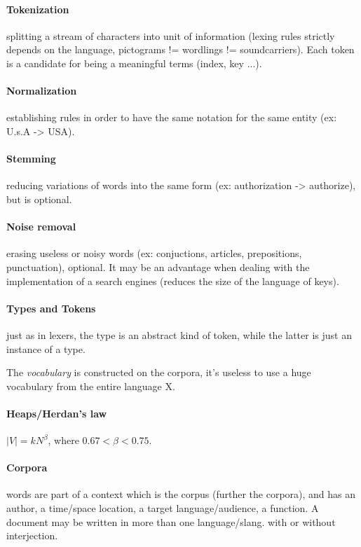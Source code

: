 \paragraph{Tokenization} splitting a stream of characters into unit of information (lexing rules strictly depends on the language, pictograms != wordlings != soundcarriers).
Each token is a candidate for being a meaningful terms (index, key ...).

\paragraph{Normalization} establishing rules in order to have the same notation for the same entity (ex: U.s.A -> USA).

\paragraph{Stemming} reducing variations of words into the same form (ex: authorization -> authorize), but is optional.

\paragraph{Noise removal} erasing useless or noisy words (ex: conjuctions, articles, prepositions, punctuation), optional.
It may be an advantage when dealing with the implementation of a search engines (reduces the size of the language of keys).

\paragraph{Types and Tokens} just as in lexers, the type is an abstract kind of token, while the latter is just an instance of a type.

The \textit{vocabulary} is constructed on the corpora, it's useless to use a huge vocabulary from the entire language X.

\paragraph{Heaps/Herdan's law} $|V| = kN^\beta$, where $0.67 < \beta < 0.75$.

\paragraph{Corpora} words are part of a context which is the corpus (further the corpora), and has an author, a time/space location, a target language/audience, a function. A document may be written in more than one language/slang. with or without interjection.

